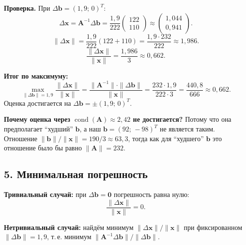 \documentclass{article}
\begin{document}
\textbf{Проверка.} При $\Delta\mathbf{b} = (1{,}9;\, 0)^T$:
\begin{equation}
\Delta\mathbf{x} = \mathbf{A}^{-1}\Delta\mathbf{b} = \frac{1{,}9}{222} \begin{pmatrix} 122 \\ 110 \end{pmatrix} \approx \begin{pmatrix} 1{,}044 \\ 0{,}941 \end{pmatrix}.
\end{equation}
\begin{equation}
\|\Delta\mathbf{x}\| = \frac{1{,}9}{222}(122 + 110) = \frac{1{,}9 \cdot 232}{222} \approx 1{,}986.
\end{equation}
\begin{equation}
\frac{\|\Delta\mathbf{x}\|}{\|\mathbf{x}\|} = \frac{1{,}986}{3} \approx 0{,}662.
\end{equation}

\textbf{Итог по максимуму:}
\begin{equation}
\boxed{\max_{\|\Delta\mathbf{b}\|=1{,}9} \frac{\|\Delta\mathbf{x}\|}{\|\mathbf{x}\|} = \frac{\|\mathbf{A}^{-1}\| \cdot \|\Delta\mathbf{b}\|}{\|\mathbf{x}\|} = \frac{232 \cdot 1{,}9}{222 \cdot 3} = \frac{440{,}8}{666} \approx 0{,}662.}
\end{equation}
Оценка достигается на $\Delta\mathbf{b} = \pm(1{,}9;\, 0)^T$.

\textbf{Почему оценка через $\operatorname{cond}(\mathbf{A}) \approx 2{,}42$ не достигается?} Потому что она предполагает ``худший'' $\mathbf{b}$, а наш $\mathbf{b} = (92;\, -98)^T$ не является таким. Отношение $\|\mathbf{b}\|/\|\mathbf{x}\| = 190/3 \approx 63{,}3$, тогда как для ``худшего'' $\mathbf{b}$ это отношение было бы равно $\|\mathbf{A}\| = 232$.

\subsection*{5. Минимальная погрешность}

\textbf{Тривиальный случай:} при $\Delta\mathbf{b} = \mathbf{0}$ погрешность равна нулю:
\begin{equation}
\frac{\|\Delta\mathbf{x}\|}{\|\mathbf{x}\|} = 0.
\end{equation}

\textbf{Нетривиальный случай:} найдём минимум $\|\Delta\mathbf{x}\|/\|\mathbf{x}\|$ при фиксированном $\|\Delta\mathbf{b}\| = 1{,}9$, т.\,е. минимум $\|\mathbf{A}^{-1}\Delta\mathbf{b}\|/\|\Delta\mathbf{b}\|$.
\end{document}
